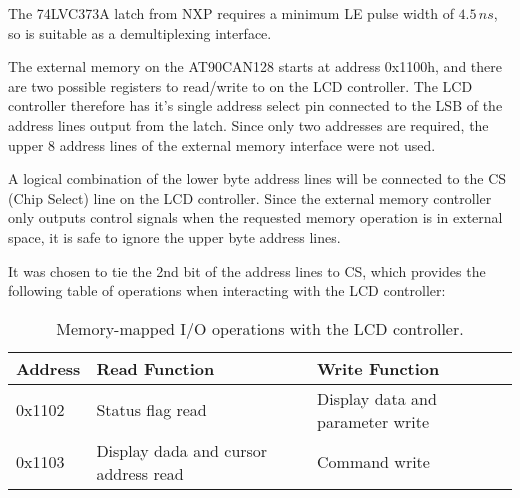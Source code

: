 \documentclass[a4paper,10pt]{scrreprt}
\begin{document}
The 74LVC373A latch from NXP requires a minimum LE pulse width of $4.5\,ns$, so is suitable as a demultiplexing interface.

The external memory on the AT90CAN128 starts at address 0x1100h, and there are two possible registers to read/write to on the LCD controller. The LCD controller therefore has it's single address select pin connected to the LSB of the address lines output from the latch. Since only two addresses are required, the upper 8 address lines of the external memory interface were not used.

A logical combination of the lower byte address lines will be connected to the CS (Chip Select) line on the LCD controller. Since the external memory controller only outputs control signals when the requested memory operation is in external space, it is safe to ignore the upper byte address lines.

It was chosen to tie the 2nd bit of the address lines to CS, which provides the following table of operations when interacting with the LCD controller:

\begin{table}
  \begin{center}
    \caption{Memory-mapped I/O operations with the LCD controller.}
    \begin{tabular}{|l|l|l|}
      \hline
      Address & Read Function & Write Function\\
      \hline
      \hline
      0x1102 & Status flag read & Display data and parameter write\\
      \hline
      0x1103 & Display dada and cursor address read & Command write\\
      \hline
    \end{tabular}
  \end{center}
\end{table} 
\end{document}
